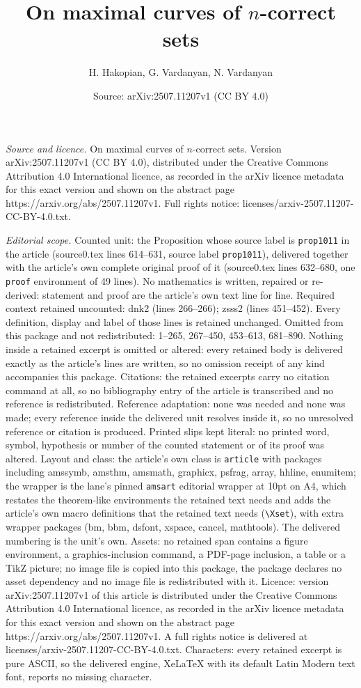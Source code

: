 \documentclass[10pt,a4paper]{amsart}
\title[On maximal curves of $n$-correct sets]{On maximal curves of $n$-correct sets}
\author{H. Hakopian, G. Vardanyan, N. Vardanyan}
\date{Source: arXiv:2507.11207v1 (CC BY 4.0)}
\begin{document}
\maketitle

\noindent\emph{Source and licence.} On maximal curves of $n$-correct sets. Version arXiv:2507.11207v1 (CC BY 4.0), distributed under the Creative Commons Attribution 4.0 International licence, as recorded in the arXiv licence metadata for this exact version and shown on the abstract page https://arxiv.org/abs/2507.11207v1. Full rights notice: licenses/arxiv-2507.11207-CC-BY-4.0.txt.\par\smallskip

\noindent\textit{Editorial scope.} Counted unit: the Proposition whose source label is \texttt{prop1011} in the article (source0.tex lines 614--631, source label \texttt{prop1011}), delivered together with the article's own complete original proof of it (source0.tex lines 632--680, one \texttt{proof} environment of 49 lines). No mathematics is written, repaired or re-derived: statement and proof are the article's own text line for line. Required context retained uncounted: dnk2 (lines 266--266); zsss2 (lines 451--452). Every definition, display and label of those lines is retained unchanged. Omitted from this package and not redistributed: 1--265, 267--450, 453--613, 681--890. Nothing inside a retained excerpt is omitted or altered: every retained body is delivered exactly as the article's lines are written, so no omission receipt of any kind accompanies this package. Citations: the retained excerpts carry no citation command at all, so no bibliography entry of the article is transcribed and no reference is redistributed. Reference adaptation: none was needed and none was made; every reference inside the delivered unit resolves inside it, so no unresolved reference or citation is produced. Printed slips kept literal: no printed word, symbol, hypothesis or number of the counted statement or of its proof was altered. Layout and class: the article's own class is \texttt{article} with packages including amssymb, amsthm, amsmath, graphicx, psfrag, array, hhline, enumitem; the wrapper is the lane's pinned \texttt{amsart} editorial wrapper at 10pt on A4, which restates the theorem-like environments the retained text needs and adds the article's own macro definitions that the retained text needs (\texttt{\textbackslash Xset}), with extra wrapper packages (bm, bbm, dsfont, xspace, cancel, mathtools). The delivered numbering is the unit's own. Assets: no retained span contains a figure environment, a graphics-inclusion command, a PDF-page inclusion, a table or a TikZ picture; no image file is copied into this package, the package declares no asset dependency and no image file is redistributed with it. Licence: version arXiv:2507.11207v1 of this article is distributed under the Creative Commons Attribution 4.0 International licence, as recorded in the arXiv licence metadata for this exact version and shown on the abstract page https://arxiv.org/abs/2507.11207v1. A full rights notice is delivered at licenses/arxiv-2507.11207-CC-BY-4.0.txt. Characters: every retained excerpt is pure ASCII, so the delivered engine, XeLaTeX with its default Latin Modern text font, reports no missing character.
\end{document}
